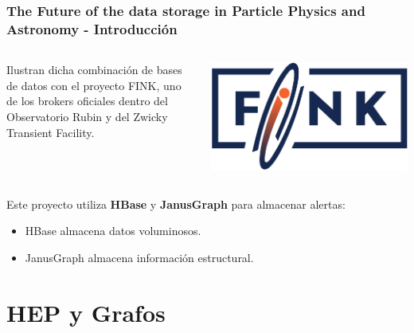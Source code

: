\begin{frame}
    \frametitle{The Future of the data storage in Particle Physics and Astronomy - Introducción}

    \begin{columns}
        \begin{column}{0.67\textwidth}
            Ilustran dicha combinación de  bases de datos con el proyecto FINK, uno de los brokers oficiales dentro del Observatorio Rubin y del Zwicky Transient Facility.
        \end{column}
        \begin{column}{0.3\textwidth}
            \centering
            \includegraphics[width=1\textwidth]{images/fink_logo.png}
        \end{column}
    \end{columns}

    \vspace{0.15cm}

    Este proyecto utiliza \textbf{HBase} y \textbf{JanusGraph} para almacenar alertas:
    
    \begin{itemize}
        \item HBase almacena datos voluminosos.
        \item JanusGraph almacena información estructural.
    \end{itemize}
\end{frame}

\section{HEP y Grafos}

